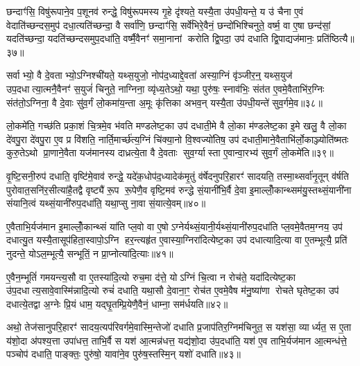 छन्दाꣳ॑सि॒ विषु॑रूपाने॒व प॒शूनव॑ रुन्द्धे॒ विषु॑रूपमस्य गृ॒हे दृ॑श्यते॒ यस्यै॒ता उ॑पधी॒यन्ते॒ य उ॑ चैना ए॒वं वेदाति॑च्छन्दस॒मुप॑ दधा॒त्यति॑च्छन्दा॒ वै सर्वा॑णि॒ छन्दाꣳ॑सि॒ सर्वे॑भिरे॒वैनं॒ छन्दो॑भिश्चिनुते॒ वर्ष्म॒ वा ए॒षा छन्द॑सां॒ यदति॑च्छन्दा॒ यदति॑च्छन्दसमुप॒दधा॑ति॒ वर्ष्मै॒वैनꣳ॑ समा॒नानां करोति द्वि॒पदा॒ उप॑ दधाति द्वि॒पाद्यज॑मानः॒ प्रति॑ष्ठित्यै॥३७॥

{\anuvakamend[{तेज॑ ए॒व प॒शवः॑ प॒शवो॒ यज॑मान॒ एक॑ञ्च॥८॥}]}

सर्वाभ्यो॒ वै दे॒वताभ्यो॒ऽग्निश्ची॑यते॒ यथ्स॒युजो॒ नोप॑द॒ध्याद्दे॒वता॑ अस्या॒ग्निं वृ॑ञ्जीर॒न्॒ यथ्स॒युज॑ उप॒दधात्या॒त्मनै॒वैनꣳ॑ स॒युजं॑ चिनुते॒ नाग्निना॒ व्यृ॑ध्य॒तेऽथो॒ यथा॒ पुरु॑षः॒ स्नाव॑भिः॒ संत॑त ए॒वमे॒वैताभि॑र॒ग्निः संत॑तो॒ऽग्निना॒ वै दे॒वाः सु॑व॒र्गं लो॒कमा॑य॒न्ता अ॒मूः कृ॑त्तिका अभव॒न् यस्यै॒ता उ॑पधी॒यन्ते॑ सुव॒र्गमे॒व॥३८॥

लो॒कमे॑ति॒ गच्छ॑ति प्रका॒शं चि॒त्रमे॒व भ॑वति मण्डलेष्ट॒का उप॑ दधाती॒मे वै लो॒का म॑ण्डलेष्ट॒का इ॒मे खलु॒ वै लो॒का दे॑वपु॒रा दे॑वपु॒रा ए॒व प्र वि॑शति॒ नार्ति॒मार्च्छ॑त्य॒ग्निं चि॑क्या॒नो वि॒श्वज्यो॑तिष॒ उप॑ दधाती॒माने॒वैताभि॑र्लो॒काञ्ज्योति॑ष्मतः कुरु॒तेऽथो प्रा॒णाने॒वैता यज॑मानस्य दाध्रत्ये॒ता वै दे॒वताः सुव॒र्ग्यास्ता ए॒वान्वा॒रभ्य॑ सुव॒र्गं लो॒कमे॑ति॥३९॥

{\anuvakamend[{सु॒व॒र्गमे॒व ता ए॒व च॒त्वारि॑ च॥९॥}]}

वृ॒ष्टि॒सनी॒रुप॑ दधाति॒ वृष्टि॑मे॒वाव॑ रुन्द्धे॒ यदे॑क॒धोप॑द॒ध्यादेक॑मृ॒तुं व॑र्\mbox{}षेदनुपरि॒हारꣳ॑ सादयति॒ तस्मा॒थ्सर्वा॑नृ॒तून् व॑र्\mbox{}षति पुरोवात॒सनि॑र॒सीत्या॑है॒तद्वै वृष्ट्यै॑ रू॒प रू॒पेणै॒व वृष्टि॒मव॑ रुन्द्धे सं॒यानी॑भि॒र्वै दे॒वा इ॒माल्लोँ॒कान्थ्सम॑यु॒स्तथ्सं॒यानी॑ना संयानि॒त्वं यथ्सं॒यानी॑रुप॒दधा॑ति॒ यथा॒प्सु ना॒वा सं॒यात्ये॒वम्॥४०॥

ए॒वैताभि॒र्यज॑मान इ॒माल्लोँ॒कान्थ्सं या॑ति प्ल॒वो वा ए॒षोऽग्नेर्यथ्सं॒यानी॒र्यथ्सं॒यानी॑रुप॒दधा॑ति प्ल॒वमे॒वैतम॒ग्नय॒ उप॑ दधात्यु॒त यस्यै॒तासूप॑हिता॒स्वापो॒ऽग्नि हर॒न्त्यहृ॑त ए॒वास्या॒ग्निरा॑दित्येष्ट॒का उप॑ दधात्यादि॒त्या वा ए॒तम्भूत्यै॒ प्रति॑ नुदन्ते॒ योऽल॒म्भूत्यै॒ सन्भूतिं॒ न प्रा॒प्नोत्या॑दि॒त्याः॥४१॥

ए॒वैन॒म्भूतिं॑ गमयन्त्य॒सौ वा ए॒तस्या॑दि॒त्यो रुच॒मा द॑त्ते॒ योऽग्निं चि॒त्वा न रोच॑ते॒ यदा॑दित्येष्ट॒का उ॑प॒दधात्य॒सावे॒वास्मि॑न्नादि॒त्यो रुचं॑ दधाति॒ यथा॒सौ दे॒वाना॒ꣳ॒ रोच॑त ए॒वमे॒वैष म॑नु॒ष्या॑णा रोचते घृतेष्ट॒का उप॑ दधात्ये॒तद्वा अ॒ग्नेः प्रि॒यं धाम॒ यद्घृ॒तम्प्रि॒येणै॒वैनं॒ धाम्ना॒ सम॑र्धयति॥४२॥

अथो॒ तेज॑सानुपरि॒हारꣳ॑ सादय॒त्यप॑रिवर्गमे॒वास्मि॒न्तेजो॑ दधाति प्र॒जाप॑तिर॒ग्निम॑चिनुत॒ स यश॑सा॒ व्यार्ध्यत॒ स ए॒ता य॑शो॒दा अ॑पश्य॒त्ता उपा॑धत्त॒ ताभि॒र्वै स यश॑ आ॒त्मन्न॑धत्त॒ यद्य॑शो॒दा उ॑प॒दधा॑ति॒ यश॑ ए॒व ताभि॒र्यज॑मान आ॒त्मन्ध॑त्ते॒ पञ्चोप॑ दधाति॒ पाङ्क्तः॒ पुरु॑षो॒ यावा॑ने॒व पुरु॑ष॒स्तस्मि॒न् यशो॑ दधाति॥४३॥

